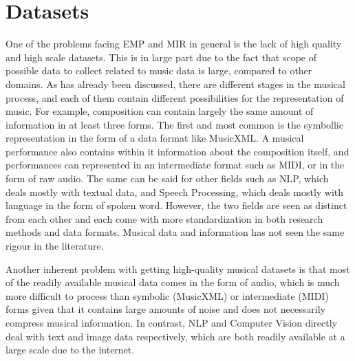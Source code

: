 \section{Datasets}
One of the problems facing EMP and MIR in general is the lack of high quality and high scale datasets\cite{cancino2018computational}. This is in large part due to the fact that scope of possible data to collect related to music data is large, compared to other domains. As has already been discussed, there are different stages in the musical process, and each of them contain different possibilities for the representation of music. For example, composition can contain largely the same amount of information in at least three forms. The first and most common is the symbollic representation in the form of a data format like MusicXML. A musical performance also contains within it information about the composition itself, and performances can represented in an intermediate format such as MIDI, or in the form of raw audio. The same can be said for other fields such as NLP, which deals mostly with textual data, and Speech Processing, which deals mostly with language in the form of spoken word. However, the two fields are seen as distinct from each other and each come with more standardization in both research methods and data formats. Musical data and information has not seen the same rigour in the literature. 

Another inherent problem with getting high-quality musical datasets is that most of the readily available musical data comes in the form of audio, which is much more difficult to process than symbolic (MusicXML) or intermediate (MIDI) forms given that it contains large amounts of noise and does not necessarily compress musical information. In contrast, NLP and Computer Vision directly deal with text and image data respectively, which are both readily available at a large scale due to the internet. 

